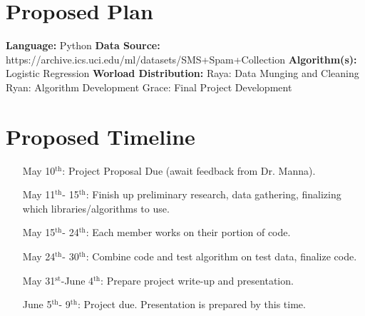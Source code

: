 \documentclass[12pt]{article} %
\newcommand\tab[1][1cm]{\hspace*{#1}}
\begin{document}
\section*{Proposed Plan}

\textbf{Language:} Python \newline
\textbf{Data Source:} https://archive.ics.uci.edu/ml/datasets/SMS+Spam+Collection \newline
\textbf{Algorithm(s):} Logistic Regression \newline
\textbf{Worload Distribution:} \newline
\tab Raya: Data Munging and Cleaning \newline
\tab Ryan: Algorithm Development \newline
\tab Grace: Final Project Development \newline



\section*{Proposed Timeline}

\begin{enumerate}
	\item[May 10$^{\text{th}}$:] Project Proposal Due (await feedback from Dr. Manna).
	\item[May 11$^{\text{th}}$- 15$^{\text{th}}$:] Finish up preliminary research, data gathering, finalizing which libraries/algorithms to use.
	\item[May 15$^{\text{th}}$- 24$^{\text{th}}$:] Each member works on their portion of code.
	\item[May 24$^{\text{th}}$- 30$^{\text{th}}$:] Combine code and test algorithm on test data, finalize code.
	\item[May 31$^{\text{st}}$-June 4$^{\text{th}}$:] Prepare project write-up and presentation.
	\item[June 5$^{\text{th}}$- 9$^{\text{th}}$:] Project due. Presentation is prepared by this time. 
\end{enumerate}
 
\end{document}
